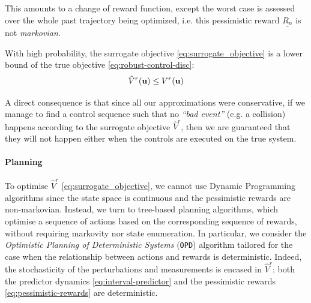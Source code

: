 \documentclass{article}
\begin{document}
This amounts to a change of reward function, except the worst case is assessed over the whole past trajectory being optimized, i.e. this pessimistic reward $\underline{R_n}$ is not \emph{markovian}.

\begin{proposition}
\label{prop:lower-bound}
With high probability, the surrogate objective  \eqref{eq:surrogate_objective} is a lower bound of the true objective \eqref{eq:robust-control-disc}:
\begin{equation}
\hat{V}^r(\mathbf{u}) \leq V^r(\mathbf{u})
\end{equation}
\end{proposition}

A direct consequence is that since all our approximations were conservative, if we manage to find a control sequence such that no \textit{``bad event''} (e.g. a collision) happens according to the surrogate objective $\hat{V}^r$, then we are guaranteed that they will not happen either when the controls are executed on the true system. 

\paragraph{Planning}
To optimise $\hat{V}^r$ \eqref{eq:surrogate_objective}, we cannot use Dynamic Programming algorithms since the state space is continuous and the pessimistic rewards are non-markovian. Instead, we turn to tree-based planning algorithms, which optimise a sequence of actions based on the corresponding sequence of rewards, without requiring markovity nor state enumeration. In particular, we consider the \emph{Optimistic Planning of Deterministic Systems} (\texttt{OPD}) algorithm \citep{Hren2008} tailored for the case when the relationship between actions and rewards is deterministic. Indeed, the stochasticity of the perturbations and measurements is encased in $\hat{V}^r$: both the predictor dynamics \eqref{eq:interval-predictor} and the pessimistic rewards \eqref{eq:pessimistic-rewards} are deterministic.
\end{document}

